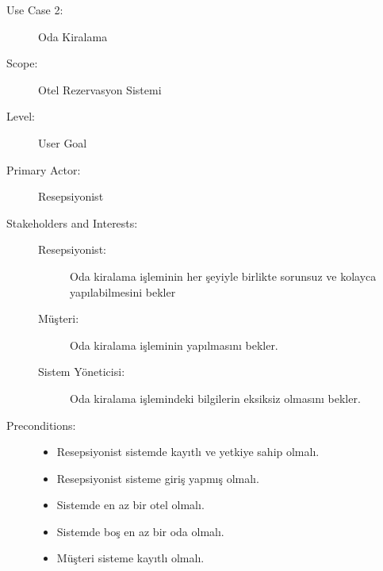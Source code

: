\documentclass[12pt,a4paper]{report}
\begin{document}
\begin{description}
\item[Use Case 2:] Oda Kiralama \\
\item[Scope:] Otel Rezervasyon Sistemi
\item[Level:] User Goal
\item[Primary Actor:] Resepsiyonist 
\item[Stakeholders and Interests:] \hspace{10 mm}
\begin{description} 
\item[Resepsiyonist:] Oda kiralama işleminin her şeyiyle birlikte sorunsuz ve kolayca yapılabilmesini bekler
\item[Müşteri:] Oda kiralama işleminin yapılmasını bekler.
\item[Sistem Yöneticisi:] Oda kiralama işlemindeki bilgilerin eksiksiz olmasını bekler.
\end{description}
\item[Preconditions:] \hspace{10mm}
\begin{itemize}
\item Resepsiyonist sistemde kayıtlı ve yetkiye sahip olmalı.
\item Resepsiyonist sisteme giriş yapmış olmalı.
\item Sistemde en az bir otel olmalı.
\item Sistemde boş en az bir oda olmalı.
\item Müşteri sisteme kayıtlı olmalı.
\end{itemize}


\end{description}
\end{document}
